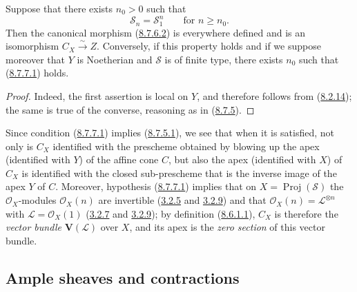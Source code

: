 \begin{corollary}[8.7.7]
\label{II.8.7.7}
Suppose that there exists $n_0>0$ such that
\begin{equation}
\label{II.8.7.7.1}
  \mathcal{S}_n=\mathcal{S}_1^n
  \qquad\text{for }n\geqslant n_0.
\tag{8.7.7.1}
\end{equation}
Then the canonical morphism \textup{(\hyperref[II.8.7.6.2]{8.7.6.2})} is everywhere
defined and is an isomorphism $C_X\xrightarrow{\sim}Z$. Conversely, if this
property holds and if we suppose moreover that $Y$ is Noetherian and
$\mathcal{S}$ is of finite type, there exists $n_0$ such that
\textup{(\hyperref[II.8.7.7.1]{8.7.7.1})} holds.
\end{corollary}

\begin{proof}
Indeed, the first assertion is local on $Y$, and therefore follows from
(\hyperref[II.8.2.14]{8.2.14}); the same is true of the converse,
reasoning as in (\hyperref[II.8.7.5]{8.7.5}).
\end{proof}

\begin{remark}[8.7.8]
\label{II.8.7.8}
Since condition (\hyperref[II.8.7.7.1]{8.7.7.1}) implies
(\hyperref[II.8.7.5.1]{8.7.5.1}), we see that when it is satisfied, not
only is $C_X$ identified with the prescheme obtained by blowing up the apex
(identified with $Y$) of the affine cone $C$, but also the apex (identified
with $X$) of $C_X$ is identified with the closed sub-prescheme that is the
inverse image of the apex $Y$ of $C$. Moreover, hypothesis
(\hyperref[II.8.7.7.1]{8.7.7.1}) implies that on
$X=\operatorname{Proj}(\mathcal{S})$ the $\mathcal{O}_X$-modules
$\mathcal{O}_X(n)$ are invertible (\hyperref[II.3.2.5]{3.2.5} and
\hyperref[II.3.2.9]{3.2.9}) and that
$\mathcal{O}_X(n)=\mathcal{L}^{\otimes n}$ with
$\mathcal{L}=\mathcal{O}_X(1)$ (\hyperref[II.3.2.7]{3.2.7} and
\hyperref[II.3.2.9]{3.2.9}); by definition
(\hyperref[II.8.6.1.1]{8.6.1.1}), $C_X$ is therefore the \emph{vector
bundle} $\mathbf{V}(\mathcal{L})$ over $X$, and its apex is the \emph{zero
section} of this vector bundle.
\end{remark}

\subsection{Ample sheaves and contractions}
\label{subsection:II.8.8}

